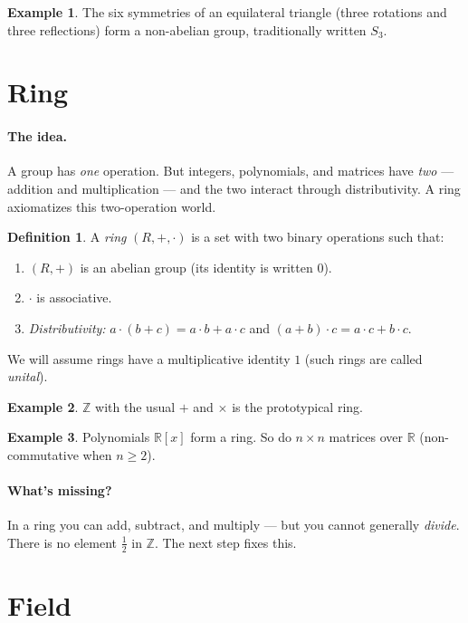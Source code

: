 \documentclass[11pt]{article}
\theoremstyle{definition}
\newtheorem*{defn}{Definition}
\newtheorem*{ex}{Example}
\begin{document}
\begin{ex}
The six symmetries of an equilateral triangle (three rotations and three reflections)
form a non-abelian group, traditionally written $S_3$.
\end{ex}

\section{Ring}

\paragraph{The idea.}
A group has \emph{one} operation. But integers, polynomials, and matrices have
\emph{two} — addition and multiplication — and the two interact through
distributivity. A ring axiomatizes this two-operation world.

\begin{defn}
A \emph{ring} $(R,+,\cdot)$ is a set with two binary operations such that:
\begin{enumerate}[label=(R\arabic*), leftmargin=3em]
  \item $(R,+)$ is an abelian group (its identity is written $0$).
  \item $\cdot$ is associative.
  \item \emph{Distributivity:} $a\cdot(b+c) = a\cdot b + a\cdot c$ and $(a+b)\cdot c = a\cdot c + b\cdot c$.
\end{enumerate}
We will assume rings have a multiplicative identity $1$ (such rings are called \emph{unital}).
\end{defn}

\begin{ex}
$\mathbb{Z}$ with the usual $+$ and $\times$ is the prototypical ring.
\end{ex}

\begin{ex}
Polynomials $\mathbb{R}[x]$ form a ring. So do $n\times n$ matrices over $\mathbb{R}$
(non-commutative when $n\geq 2$).
\end{ex}

\paragraph{What's missing?}
In a ring you can add, subtract, and multiply — but you cannot generally
\emph{divide}. There is no element $\tfrac{1}{2}$ in $\mathbb{Z}$. The next step fixes this.

\section{Field}
\end{document}
